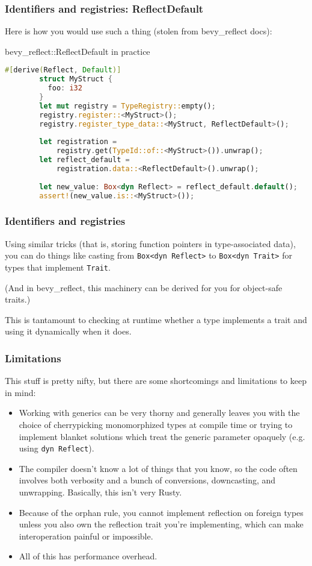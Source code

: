 \documentclass[10pt]{beamer}
\begin{document}
\begin{frame}[fragile]
    \frametitle{Identifiers and registries: ReflectDefault}
    Here is how you would use such a thing (stolen from bevy\_reflect docs):
    
	\begin{block}{bevy\_reflect::ReflectDefault in practice}
	\begin{lstlisting}[language=Rust, gobble=8]
        #[derive(Reflect, Default)]
        struct MyStruct {
          foo: i32
        }
        let mut registry = TypeRegistry::empty();
        registry.register::<MyStruct>();
        registry.register_type_data::<MyStruct, ReflectDefault>();
        
        let registration = 
            registry.get(TypeId::of::<MyStruct>()).unwrap();
        let reflect_default = 
            registration.data::<ReflectDefault>().unwrap();
        
        let new_value: Box<dyn Reflect> = reflect_default.default();
        assert!(new_value.is::<MyStruct>());
	\end{lstlisting}
	\end{block}
\end{frame}

\begin{frame}[fragile]
    \frametitle{Identifiers and registries}
    Using similar tricks (that is, storing function pointers in type-associated data), you can do things like casting from \texttt{Box<dyn Reflect>} to \texttt{Box<dyn Trait>} for types that implement \texttt{Trait}.
    
    (And in bevy\_reflect, this machinery can be derived for you for object-safe traits.) \pause
    
    This is tantamount to checking at runtime whether a type implements a trait and using it dynamically when it does.
\end{frame}

\begin{frame}[fragile]
    \frametitle{Limitations}
    This stuff is pretty nifty, but there are some shortcomings and limitations to keep in mind:
    \begin{itemize}
        \item Working with generics can be very thorny and generally leaves you with the choice of cherrypicking monomorphized types at compile time or trying to implement blanket solutions which treat the generic parameter opaquely (e.g. using \texttt{dyn Reflect}). \pause
        \item The compiler doesn't know a lot of things that you know, so the code often involves both verbosity and a bunch of conversions, downcasting, and unwrapping. Basically, this isn't very Rusty. \pause
        \item Because of the orphan rule, you cannot implement reflection on foreign types unless you also own the reflection trait you're implementing, which can make interoperation painful or impossible. \pause
        \item All of this has performance overhead. 
    \end{itemize}
\end{frame}
\end{document}
